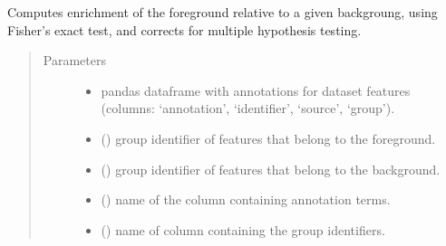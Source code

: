 \documentclass[letterpaper,10pt,english]{sphinxmanual}
\begin{document}

\begin{fulllineitems}
\label{\detokenize{_autosummary/analytics_core.analytics:analytics_core.analytics.analytics.run_enrichment}}
Computes enrichment of the foreground relative to a given backgroung, using Fisher’s exact test, and corrects for multiple hypothesis testing.
\begin{quote}\begin{description}
\item[{Parameters}] \leavevmode\begin{itemize}
\item {} 
 \textendash{} pandas dataframe with annotations for dataset features (columns: ‘annotation’, ‘identifier’, ‘source’, ‘group’).

\item {} 
 () \textendash{} group identifier of features that belong to the foreground.

\item {} 
 () \textendash{} group identifier of features that belong to the background.

\item {} 
 () \textendash{} name of the column containing annotation terms.

\item {} 
 () \textendash{} name of column containing the group identifiers.


\end{itemize}
\end{description}
\end{quote}
\end{fulllineitems}
\end{document}
